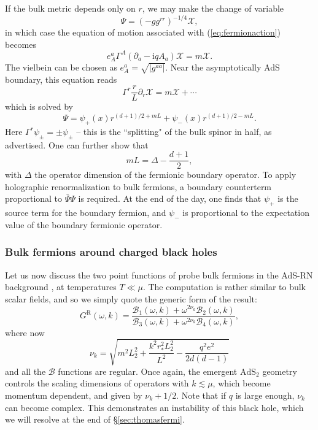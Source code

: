 \documentclass[10pt, oneside]{book}
\begin{document}
\begin{doublespace}
If the bulk metric depends only on $r$, we may make the change of variable \cite{Faulkner:2009wj} \begin{equation}
\Psi = (-g g^{rr})^{-1/4}\mathcal{X},
\end{equation}in which case the equation of motion associated with (\ref{eq:fermionaction}) becomes \begin{equation}
e^a_A \Gamma^A (\partial_a - \mathrm{i}qA_a) \mathcal{X} = m\mathcal{X} .
\end{equation}
The vielbein can be chosen as $e^a_A = \sqrt{|g^{aa}|}$.  Near the asymptotically AdS boundary, this equation reads \begin{equation}
\Gamma^r \frac{r}{L}\partial_r \mathcal{X}  = m\mathcal{X} + \cdots
\end{equation}
which is solved by \begin{equation}
\Psi = \psi_+(x)r^{(d+1)/2+mL}  +  \psi_-(x) r^{(d+1)/2-mL}.
\end{equation}
Here $\Gamma^r \psi_\pm = \pm \psi_\pm$ -- this is the ``splitting" of the bulk spinor in half, as advertised.   One can further show that \begin{equation}
mL = \Delta - \frac{d+1}{2},
\end{equation}
with $\Delta$ the operator dimension of the fermionic boundary operator.  To apply holographic renormalization to bulk fermions, a boundary counterterm proportional to $\bar\Psi \Psi$ is required.  At the end of the day, one finds that $\psi_+$ is the source term for the boundary fermion, and $\psi_-$ is proportional to the expectation value of the boundary fermionic operator.    

\subsubsection{Bulk fermions around charged black holes}
Let us now discuss the two point functions of probe bulk fermions in the AdS-RN background \cite{Faulkner:2009wj, Liu:2009dm, Cubrovic:2009ye, Faulkner:2010zz}, at temperatures $T\ll \mu$.   The computation is rather similar to bulk scalar fields, and so we simply quote the generic form of the result:  \begin{equation}
G^{\mathrm{R}}(\omega, k) = \frac{\mathcal{B}_1(\omega,k) + \omega^{2\nu_k} \mathcal{B}_2(\omega,k)}{\mathcal{B}_3(\omega,k) + \omega^{2\nu_k}\mathcal{B}_4(\omega,k)},
\end{equation}
where now \begin{equation}
\nu_k =  \sqrt{m^2 L_2^2 + \frac{k^2r_*^2L_2^2}{L^2} - \frac{q^2e^2}{2d(d-1)}} \label{eq:nukferm}
\end{equation}
and all the $\mathcal{B}$ functions are regular.   Once again,  the emergent $\mathrm{AdS}_2$ geometry controls the scaling dimensions of operators with $k\lesssim \mu$, which become momentum dependent, and given by $\nu_k + 1/2$.  Note that if $q$ is large enough,  $\nu_k$ can become complex.   This demonstrates an instability of this black hole, which we will resolve at the end of \S \ref{sec:thomasfermi}.


\end{doublespace}
\end{document}
